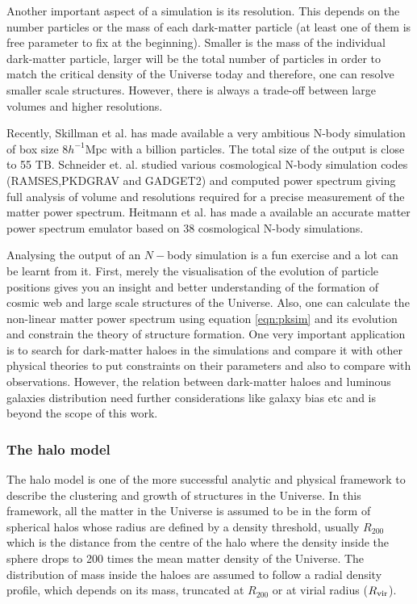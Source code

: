 Another important aspect of a simulation is its resolution. This depends on the number 
particles or the mass of each dark-matter particle (at least one of them is free parameter 
to fix at the beginning). Smaller is the mass of the individual dark-matter particle, 
larger will be the total number of particles in order to match the critical density of 
the Universe today and therefore, one can resolve smaller scale structures. However, 
there is always a trade-off between large volumes and higher resolutions. 


Recently, Skillman et al. \cite{2014arXiv1407.2600S} has made available
a very ambitious N-body simulation of box size $8 h^{-1} \mathrm{Mpc}$ with
a billion particles. The total size of the output is close to 55 TB.
Schneider et. al. \cite{2015arXiv150305920S} studied various cosmological
N-body simulation codes (RAMSES,PKDGRAV and GADGET2) and computed power 
spectrum giving full analysis of volume and resolutions required for 
a precise measurement of the matter power spectrum.
Heitmann et al. \cite{2009ApJ...705..156H,2010ApJ...715..104H,2010ApJ...713.1322L,2014ApJ...780..111H} has made a available an accurate matter power spectrum
emulator based on 38 cosmological N-body simulations. 

Analysing the output of an $N-$body simulation is a fun exercise and a lot can be learnt
from it. First, merely the visualisation of the evolution of particle positions gives
you an insight and better understanding of the formation of cosmic web and large
scale structures of the Universe. 
Also, one can calculate the non-linear matter power spectrum using equation \ref{eqn:pksim} and its
evolution and constrain the theory of structure formation. One very important
application is to search for dark-matter haloes in the simulations and compare
it with other physical theories to put constraints on their parameters and also
to compare with observations. However, the relation between dark-matter haloes
and luminous galaxies distribution need further considerations like galaxy 
bias etc and is beyond the scope of this work. 

\subsubsection{The halo model}

The halo model \cite{1977ApJ...217..331M,2000ApJ...543..503M,2000MNRAS.318.1144P,2000MNRAS.318..203S} 
is one of the more successful analytic and physical framework to describe
the clustering and growth of structures in the Universe. In this framework, all the matter
in the Universe is assumed to be in the form of spherical halos whose radius are defined by a 
density threshold, usually $R_{200}$ which is the distance from the centre of the halo where
the density inside the sphere drops to 200 times the mean matter density of the Universe. 
The  distribution of mass inside the haloes are assumed to follow a radial density 
profile, which depends on its mass, truncated at $R_{200}$ or at virial 
radius ($R_{\rm vir}$).

